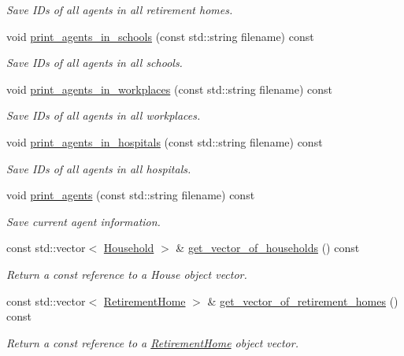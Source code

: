 \begin{DoxyCompactItemize}
\begin{DoxyCompactList}\small\item\em Save I\+Ds of all agents in all retirement homes. \end{DoxyCompactList}\item 
void \hyperlink{classABM_ab3acbd3d496e2994367a0cfb0bdd7984}{print\+\_\+agents\+\_\+in\+\_\+schools} (const std\+::string filename) const
\begin{DoxyCompactList}\small\item\em Save I\+Ds of all agents in all schools. \end{DoxyCompactList}\item 
void \hyperlink{classABM_a60163307e6a7b6461bde10d86f6ccbca}{print\+\_\+agents\+\_\+in\+\_\+workplaces} (const std\+::string filename) const
\begin{DoxyCompactList}\small\item\em Save I\+Ds of all agents in all workplaces. \end{DoxyCompactList}\item 
void \hyperlink{classABM_adf2f12e0f3d1f134f553869e4e318765}{print\+\_\+agents\+\_\+in\+\_\+hospitals} (const std\+::string filename) const
\begin{DoxyCompactList}\small\item\em Save I\+Ds of all agents in all hospitals. \end{DoxyCompactList}\item 
void \hyperlink{classABM_a736b8a17c8198534c58d9a36b35bb5cd}{print\+\_\+agents} (const std\+::string filename) const
\begin{DoxyCompactList}\small\item\em Save current agent information. \end{DoxyCompactList}\item 
const std\+::vector$<$ \hyperlink{classHousehold}{Household} $>$ \& \hyperlink{classABM_aa5cb222cd922ca221e063a840dc52aa1}{get\+\_\+vector\+\_\+of\+\_\+households} () const
\begin{DoxyCompactList}\small\item\em Return a const reference to a House object vector. \end{DoxyCompactList}\item 
const std\+::vector$<$ \hyperlink{classRetirementHome}{Retirement\+Home} $>$ \& \hyperlink{classABM_a1265f522554b325c1495bfb1e5a2e921}{get\+\_\+vector\+\_\+of\+\_\+retirement\+\_\+homes} () const
\begin{DoxyCompactList}\small\item\em Return a const reference to a \hyperlink{classRetirementHome}{Retirement\+Home} object vector. \end{DoxyCompactList}\item 

\end{DoxyCompactItemize}
